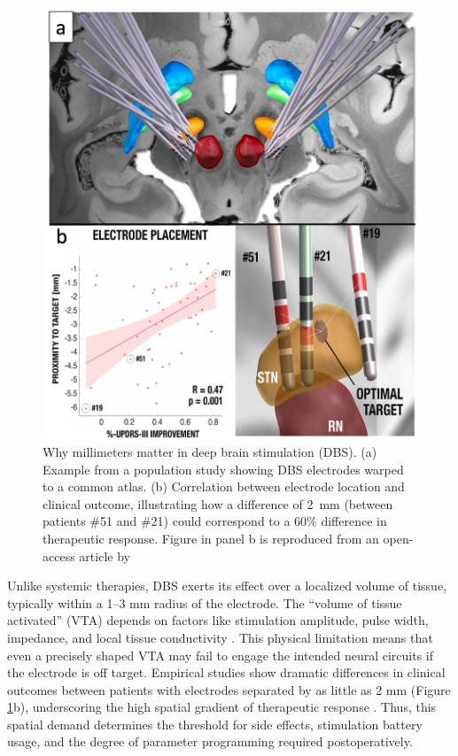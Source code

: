 \begin{figure}[hbt!]
    \centering
    \includegraphics[width=1\linewidth]{figs/ch1_Figure_whymm.png}
    \caption{Why millimeters matter in deep brain stimulation (DBS). (a) Example from a population study showing DBS electrodes warped to a common atlas. (b) Correlation between electrode location and clinical outcome, illustrating how a difference of 2~mm (between patients \#51 and \#21) could correspond to a 60\% difference in therapeutic response. Figure in panel b is reproduced from an open-access article by \cite{Horn2018-qq}}
    \label{fig:ch1_Figure_whymm}
\end{figure}

Unlike systemic therapies, DBS exerts its effect over a localized volume of tissue, typically within a 1–3 mm radius of the electrode. The “volume of tissue activated” (VTA) depends on factors like stimulation amplitude, pulse width, impedance, and local tissue conductivity \cite{McIntyre2006-wh,Butson2007-bn}. This physical limitation means that even a precisely shaped VTA may fail to engage the intended neural circuits if the electrode is off target. Empirical studies show dramatic differences in clinical outcomes between patients with electrodes separated by as little as 2 mm (Figure \ref{fig:ch1_Figure_whymm}b), underscoring the high spatial gradient of therapeutic response \cite{Horn2018-qq, Maks2009-ci}. Thus, this spatial demand determines the threshold for side effects, stimulation battery usage, and the degree of parameter programming required postoperatively. 

